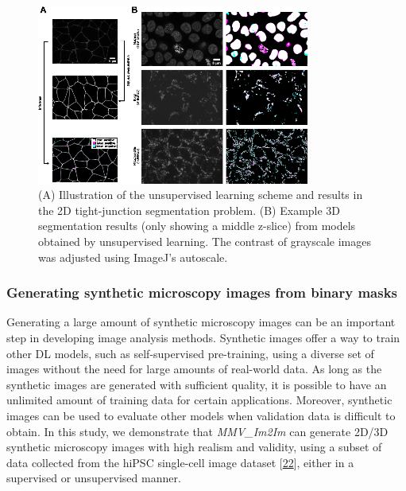 \begin{figure}
\hypertarget{fig:unsupervised}{%
\centering
\includegraphics[width=0.8\textwidth,height=\textheight]{images/unsupervised_seg_justin.png}
\caption{(A) Illustration of the unsupervised learning scheme and results in the 2D tight-junction segmentation problem. (B) Example 3D segmentation results (only showing a middle z-slice) from models obtained by unsupervised learning. The contrast of grayscale images was adjusted using ImageJ's autoscale.}\label{fig:unsupervised}
}
\end{figure}

\hypertarget{generating-synthetic-microscopy-images-from-binary-masks}{%
\subsubsection{Generating synthetic microscopy images from binary masks}\label{generating-synthetic-microscopy-images-from-binary-masks}}

Generating a large amount of synthetic microscopy images can be an important step in developing image analysis methods. Synthetic images offer a way to train other DL models, such as self-supervised pre-training, using a diverse set of images without the need for large amounts of real-world data. As long as the synthetic images are generated with sufficient quality, it is possible to have an unlimited amount of training data for certain applications. Moreover, synthetic images can be used to evaluate other models when validation data is difficult to obtain. In this study, we demonstrate that \emph{MMV\_Im2Im} can generate 2D/3D synthetic microscopy images with high realism and validity, using a subset of data collected from the hiPSC single-cell image dataset {[}\protect\hyperlink{ref-5sGcmDuy}{22}{]}, either in a supervised or unsupervised manner.

